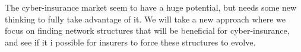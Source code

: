 The cyber-insurance market seem to have a huge potential, but needs some new thinking to fully take advantage of it. We will take a new approach where we focus on finding network structures that will be beneficial for cyber-insurance, and see if it i possible for insurers to force these structures to evolve.

